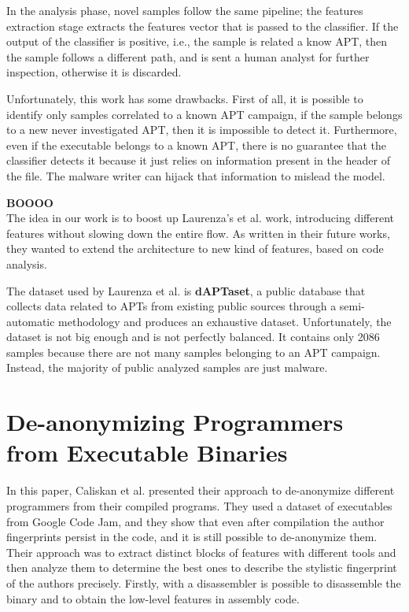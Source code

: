 In the analysis phase, novel samples follow the same pipeline; the features extraction stage extracts the features vector that is passed to the classifier. If the output of the classifier is positive, i.e., the sample is related a know APT, then the sample follows a different path, and is sent a human analyst for further inspection, otherwise it is discarded.

Unfortunately, this work has some drawbacks. First of all, it is possible to identify only samples correlated to a known APT campaign, if the sample belongs to a new never investigated APT, then it is impossible to detect it. Furthermore, even if the executable belongs to a known APT, there is no guarantee that the classifier detects it because it just relies on information present in the header of the file. The malware writer can hijack that information to mislead the model.

\textbf{BOOOO}
\\

The idea in our work is to boost up Laurenza's et al. work, introducing different features without slowing down the entire flow. As written in their future works, they wanted to extend the architecture to new kind of features, based on code analysis. 





The dataset used by Laurenza et al. is \textbf{dAPTaset}, a public database that collects data related to APTs from existing public sources through a semi-automatic methodology and produces an exhaustive dataset. Unfortunately, the dataset is not big enough and is not perfectly balanced. It contains only 2086 samples because there are not many samples belonging to an APT campaign. Instead, the majority of public analyzed samples are just malware.

\section{De-anonymizing Programmers from Executable Binaries}
In this paper, Caliskan et al. presented their approach to de-anonymize different programmers from their compiled programs. They used a dataset of executables from Google Code Jam, and they show that even after compilation the author fingerprints persist in the code, and it is still possible to de-anonymize them.\\

Their approach was to extract distinct blocks of features with different tools and then analyze them to determine the best ones to describe the stylistic fingerprint of the authors precisely. Firstly,  with a disassembler is possible to disassemble the binary and to obtain the low-level features in assembly code.

